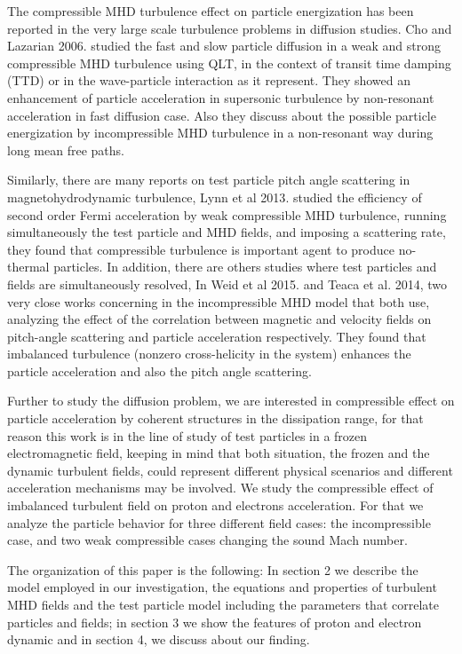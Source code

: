 \documentclass[%
aip,pop,amsmath,amssymb,
 reprint,%
]{revtex4-1}
\begin{document}
The compressible MHD turbulence effect on particle energization has been reported in the very
large scale turbulence problems in diffusion studies\cite{Chandran2003}. Cho and Lazarian 
2006\cite{CHO1}. studied the fast and slow particle diffusion in a weak and strong 
compressible MHD turbulence using QLT, in the context of transit time damping (TTD) or in 
the wave-particle interaction as it represent. They showed an enhancement of particle 
acceleration in supersonic turbulence by non-resonant acceleration in fast 
diffusion case.  Also they discuss about the possible particle energization by incompressible
MHD turbulence in a non-resonant way during long mean free paths.

Similarly, there are many reports on test particle pitch angle scattering in 
magnetohydrodynamic turbulence, Lynn et al 2013\cite{Lynn2013}. studied the efficiency of 
second order Fermi acceleration by weak compressible MHD turbulence, running simultaneously
the test particle and MHD fields, and imposing a scattering rate, they found that compressible 
turbulence is important agent to produce no-thermal particles.  In addition, there are others
studies where test particles and fields are simultaneously resolved, 
In Weid et al 2015\cite{Weidl2015}. and Teaca et al. 2014\cite{Bogdan2014}, two very close 
works concerning in the incompressible MHD model that both use, analyzing the effect of the 
correlation between magnetic and velocity fields on pitch-angle scattering and particle 
acceleration respectively. They found that imbalanced turbulence (nonzero cross-helicity in 
the system) enhances the particle acceleration and also the pitch angle scattering.

Further to study the diffusion problem, we are interested in compressible effect on particle 
acceleration by coherent structures in the dissipation range, for that reason this work is in
the line of study of test particles in a frozen electromagnetic field, keeping in mind that 
both situation, the frozen and the dynamic turbulent fields, could represent different 
physical scenarios and different acceleration mechanisms may be involved. We study the compressible 
effect of imbalanced turbulent field on proton and electrons acceleration. For that we 
analyze the particle behavior for three different field cases: the incompressible case, and 
two weak compressible cases changing the sound Mach number. 

The organization of this paper is the following:  In section 2  we describe the model 
employed in our investigation, the equations and properties of turbulent MHD fields and the 
test particle model including the parameters that correlate particles and fields; 
in section 3 we show the features of proton and electron dynamic and in section 4, we
discuss about our finding.
\end{document}

